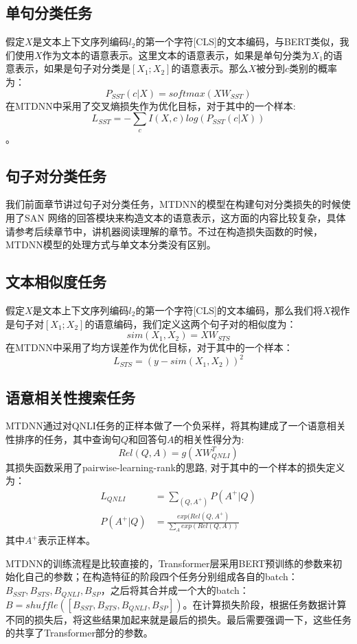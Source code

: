 \documentclass[twoside,a4paper,12pt]{book}%
\begin{document}
\subsection{单句分类任务}
假定$X$是文本上下文序列编码$l_2$的第一个字符[CLS]的文本编码，与\gls{BERT}类似，我们使用$X$作为文本的语意表示。这里文本的语意表示，如果是单句分类为$X_1$的语意表示，如果是句子对分类是$[X_1;X_2]$的语意表示。那么$X$被分到$c$类别的概率为：
$$
P_{SST}(c|X)= softmax(XW_{SST})
$$
在\gls{MTDNN}中采用了交叉熵损失作为优化目标，对于其中的一个样本:
$$
L_{SST}=-\sum_{c}I(X,c)log(P_{SST}(c|X))
$$。
\subsection{句子对分类任务}
我们前面章节讲过句子对分类任务，\gls{MTDNN}的模型在构建句对分类损失的时候使用了\gls{SAN} 网络的回答模块来构造文本的语意表示，这方面的内容比较复杂，具体请参考后续章节中，讲机器阅读理解的章节。不过在构造损失函数的时候，\gls{MTDNN}模型的处理方式与单文本分类没有区别。

\subsection{文本相似度任务}
假定$X$是文本上下文序列编码$l_2$的第一个字符[CLS]的文本编码，那么我们将$X$视作是句子对$[X_1;X_2]$的语意编码，我们定义这两个句子对的相似度为：
$$
sim(X_1,X_2) = XW_{STS}
$$
在\gls{MTDNN}中采用了均方误差作为优化目标，对于其中的一个样本：
$$
L_{STS}=(y-sim(X_1,X_2))^2
$$
\subsection{语意相关性搜索任务}

\gls{MTDNN}通过对QNLI任务的正样本做了一个负采样，将其构建成了一个语意相关性排序的任务，其中查询句$Q$和回答句$A$的相关性得分为:
$$
Rel(Q,A) = g(XW^T_{QNLI})
$$
其损失函数采用了pairwise-learning-rank的思路, 对于其中的一个样本的损失定义为：
$$
\begin{aligned}
L_{QNLI} &= \sum_{(Q,A^+)}P(A^+|Q)\\
P(A^+|Q) &= \frac{exp(Rel(Q,A^+)}{\sum_{A}exp(Rel(Q,A))}	
\end{aligned}
$$
其中$A^+$表示正样本。

\gls{MTDNN}的训练流程是比较直接的，Transformer层采用\gls{BERT}预训练的参数来初始化自己的参数；在构造特征的阶段四个任务分别组成各自的batch：$B_{SST}, B_{STS}, B_{QNLI}, B_{SP}$，之后将其合并成一个大的batch：$B = shuffle([B_{SST}, B_{STS}, B_{QNLI}, B_{SP}])$。在计算损失阶段，根据任务数据计算不同的损失后，将这些结果加起来就是最后的损失。最后需要强调一下，这些任务的共享了Transformer部分的参数。
\end{document}
